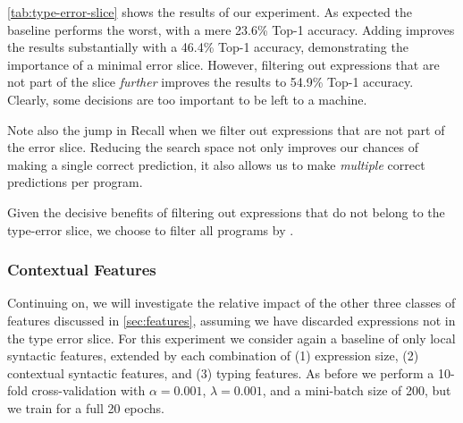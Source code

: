 \autoref{tab:type-error-slice} shows the results of our experiment.
%
As expected the baseline performs the worst, with a mere 23.6\% Top-1
accuracy.
%
Adding \InSlice improves the results substantially with a 46.4\% Top-1
accuracy, demonstrating the importance of a minimal error slice.
%
However, filtering out expressions that are not part of the slice
\emph{further} improves the results to 54.9\% Top-1 accuracy.
%
Clearly, some decisions are too important to be left to a machine.

Note also the jump in Recall when we filter out expressions that are not
part of the error slice.
%
Reducing the search space not only improves our chances of making a
single correct prediction, it also allows us to make \emph{multiple}
correct predictions per program.

Given the decisive benefits of filtering out expressions that do not
belong to the type-error slice, we choose to filter all programs by
\InSlice.

\subsubsection{Contextual Features}
\label{sec:contextual-features}

Continuing on, we will investigate the relative impact of the other
three classes of features discussed in \autoref{sec:features}, assuming
we have discarded expressions not in the type error slice.
%
For this experiment we consider again a baseline of only local syntactic
features, extended by each combination of
%
(1) expression size,
(2) contextual syntactic features, and
(3) typing features.
%
As before we perform a 10-fold cross-validation with $\alpha = 0.001$,
$\lambda = 0.001$, and a mini-batch size of 200, but we
train for a full 20 epochs.

